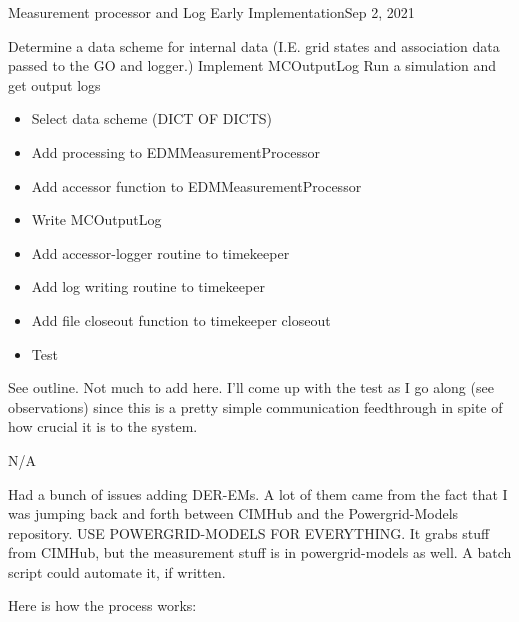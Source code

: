 \begin{entry}{Measurement processor and Log Early Implementation}{Sep 2, 2021}
    \objective 
    
    Determine a data scheme for internal data (I.E. grid states and association data passed to the GO and logger.)
    Implement MCOutputLog
    Run a simulation and get output logs

    \outline

    \begin{itemize}
        \item Select data scheme (DICT OF DICTS)
        \item Add processing to EDMMeasurementProcessor
        \item Add accessor function to EDMMeasurementProcessor
        \item Write MCOutputLog
        \item Add accessor-logger routine to timekeeper
        \item Add log writing routine to timekeeper
        \item Add file closeout function to timekeeper closeout
        \item Test

    \end{itemize}

    \procedures
    
    See outline. Not much to add here. I'll come up with the test as I go along (see observations) since this is a
    pretty simple communication feedthrough in spite of how crucial it is to the system.

    \parameters
    
    N/A

    \observations

    Had a bunch of issues adding DER-EMs. A lot of them came from the fact that I was jumping back and forth between
    CIMHub and the Powergrid-Models repository. USE POWERGRID-MODELS FOR EVERYTHING. It grabs stuff from CIMHub, but the
    measurement stuff is in powergrid-models as well. A batch script could automate it, if written.

    Here is how the process works:


\end{entry}
